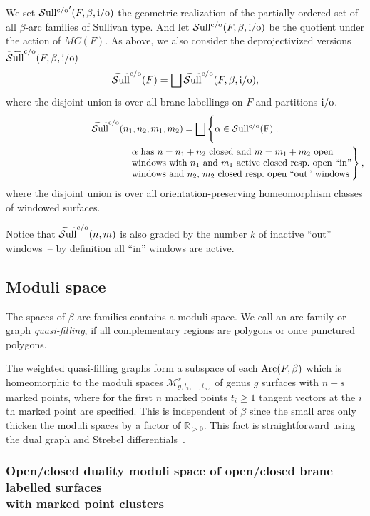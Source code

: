 \documentclass[pdftex]{sigma}
\def\M{{\mathcal M}}
\def\Sull{\rm {\mathcal S}ull^{\rm c/o}}
\def\wSull{\widetilde{\rm {\mathcal S}ull}^{\rm c/o}}
\def\Rp{{\mathbb R}_{>0}}
\begin{document}
We set
${\Sull}'(F,\beta,{\rm i/o})$ the geometric realization of the partially ordered set of all $\beta$-arc families
of Sullivan type. And let  ${\Sull}(F,\beta,{\rm i/o})$ be the quotient under the action of $MC(F)$.
As above, we also consider the deprojectivized versions $\wSull(F,\beta,{\rm i/o})$
\[
\wSull(F)=\bigsqcup \wSull(F,\beta,{\rm i/o}),
\]
where the disjoint union is over all brane-labellings on $F$ and partitions ${\rm i/o}$.
\begin{gather*}
\wSull(n_1,n_2,m_1,m_2)= \bigsqcup \Bigg\{ \alpha\in\Sull(F):  \\
\hphantom{\wSull(n_1,n_2,m_1,m_2)= \bigsqcup \Bigg\{}{}
\left. \begin{array}{@{}l@{}}\alpha ~{\rm has}~n=n_1+n_2~{\rm closed~and}~ m=m_1+m_2~{\rm open}\\
\text{windows with $n_1$ and $m_1$  active closed resp.\ open ``in''}\\
\text{windows and $n_2$, $m_2$  closed resp.\ open ``out'' windows}
\end{array}\right\},
\end{gather*}
where the
disjoint union is over all orientation-preserving
homeomorphism classes of windowed surfaces.

Notice that $\wSull(n,m)$ is also graded  by the number $k$ of
inactive ``out'' windows~-- by def\/inition all ``in'' windows are active.



\subsection{Moduli space} The spaces of $\beta$ arc families contains a moduli space.
We call an arc family or graph {\it quasi-filling}, if all complementary regions
are polygons or once punctured polygons.

The weighted quasi-f\/illing graphs form a subspace of each ${\rm Arc}(F,\beta)$ which
is homeomorphic to the moduli spaces $\M_{g,t_1,\dots, t_n,}^s$ of genus $g$ surfaces with $n+s$
marked points, where for the f\/irst $n$ marked points $t_i\geq1$ tangent vectors at the $i$th marked
point are specif\/ied. This is independent of $\beta$ since the small arcs only thicken the moduli
spaces by a factor of $\Rp$.
This fact is straightforward using the dual graph and Strebel dif\/ferentials~\cite{St}.

\subsubsection[Open/closed duality moduli space of open/closed  brane
labelled surfaces with marked point clusters]{Open/closed duality moduli space of open/closed  brane
labelled surfaces\\ with marked point clusters}
\end{document}
